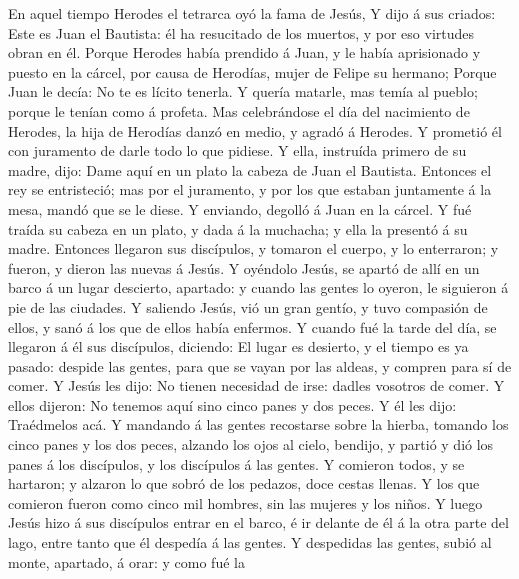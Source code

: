  En aquel tiempo Herodes el tetrarca oyó la fama de Jesús,
 Y dijo á sus criados: Este es Juan el Bautista: él ha
resucitado de los muertos, y por eso virtudes obran en él.
 Porque Herodes había prendido á Juan, y le había
aprisionado y puesto en la cárcel, por causa de Herodías, mujer de
Felipe su hermano;  Porque Juan le decía: No te es lícito
tenerla.  Y quería matarle, mas temía al pueblo; porque le
tenían como á profeta.  Mas celebrándose el día del
nacimiento de Herodes, la hija de Herodías danzó en medio, y agradó á
Herodes.  Y prometió él con juramento de darle todo lo que
pidiese.  Y ella, instruída primero de su madre, dijo:
Dame aquí en un plato la cabeza de Juan el Bautista. 
Entonces el rey se entristeció; mas por el juramento, y por los que
estaban juntamente á la mesa, mandó que se le diese.  Y
enviando, degolló á Juan en la cárcel.  Y fué traída su
cabeza en un plato, y dada á la muchacha; y ella la presentó á su madre.
 Entonces llegaron sus discípulos, y tomaron el cuerpo, y
lo enterraron; y fueron, y dieron las nuevas á Jesús.  Y
oyéndolo Jesús, se apartó de allí en un barco á un lugar descierto,
apartado: y cuando las gentes lo oyeron, le siguieron á pie de las
ciudades.  Y saliendo Jesús, vió un gran gentío, y tuvo
compasión de ellos, y sanó á los que de ellos había enfermos.
 Y cuando fué la tarde del día, se llegaron á él sus
discípulos, diciendo: El lugar es desierto, y el tiempo es ya pasado:
despide las gentes, para que se vayan por las aldeas, y compren para sí
de comer.  Y Jesús les dijo: No tienen necesidad de irse:
dadles vosotros de comer.  Y ellos dijeron: No tenemos
aquí sino cinco panes y dos peces.  Y él les dijo:
Traédmelos acá.  Y mandando á las gentes recostarse sobre
la hierba, tomando los cinco panes y los dos peces, alzando los ojos al
cielo, bendijo, y partió y dió los panes á los discípulos, y los
discípulos á las gentes.  Y comieron todos, y se
hartaron; y alzaron lo que sobró de los pedazos, doce cestas llenas.
 Y los que comieron fueron como cinco mil hombres, sin
las mujeres y los niños.  Y luego Jesús hizo á sus
discípulos entrar en el barco, é ir delante de él á la otra parte del
lago, entre tanto que él despedía á las gentes.  Y
despedidas las gentes, subió al monte, apartado, á orar: y como fué la
